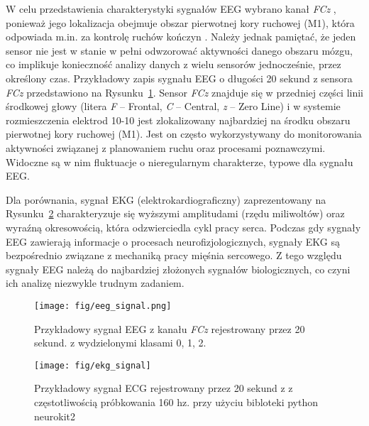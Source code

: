 \documentclass[eeg_v4.tex]{subfiles}
\begin{document}
    W celu przedstawienia charakterystyki sygnałów EEG wybrano kanał \textit{FCz}
    , ponieważ jego lokalizacja obejmuje obszar pierwotnej kory ruchowej (M1), która odpowiada m.in. za kontrolę ruchów
    kończyn \cite{Silva2020}
    . Należy jednak pamiętać, że jeden sensor nie jest w stanie w pełni odwzorować aktywności danego obszaru mózgu, co
    implikuje konieczność analizy danych z wielu sensorów jednocześnie, przez określony czas. Przykładowy zapis sygnału
    EEG o długości 20 sekund z sensora \textit{FCz} przedstawiono na Rysunku~\ref{fig:eeg_signal}. Sensor \textit{FCz}
    znajduje się w przedniej części linii środkowej głowy (litera \textit{F} – Frontal, \textit{C} – Central, \textit{z}
    – Zero Line) i w systemie rozmieszczenia elektrod 10-10 jest zlokalizowany najbardziej na środku obszaru pierwotnej
    kory ruchowej (M1). Jest on często wykorzystywany do monitorowania aktywności związanej z planowaniem ruchu oraz
    procesami poznawczymi. Widoczne są w nim fluktuacje o nieregularnym charakterze, typowe dla sygnału EEG.


    Dla porównania, sygnał EKG (elektrokardiograficzny) zaprezentowany na Rysunku~\ref{fig:ecg_signal}
    charakteryzuje się wyższymi amplitudami (rzędu miliwoltów) oraz wyraźną okresowością, która odzwierciedla cykl pracy
    serca. Podczas gdy sygnały EEG zawierają informacje o procesach neurofizjologicznych, sygnały EKG są bezpośrednio
    związane z mechaniką pracy mięśnia sercowego. Z tego względu sygnały EEG należą do najbardziej złożonych sygnałów
    biologicznych, co czyni ich analizę niezwykle trudnym zadaniem.


    \begin{figure}[h]
        \centering
        \texttt{[image: fig/eeg\_signal.png]}
        \caption
        {Przykładowy sygnał EEG z kanału \textit{FCz} rejestrowany przez 20 sekund. z wydzielonymi klasami 0, 1, 2.}
        \label{fig:eeg_signal}
    \end{figure}

    \begin{figure}[h]
        \centering
        \texttt{[image: fig/ekg\_signal]}
        \caption{Przykładowy sygnał ECG rejestrowany przez 20 sekund z z częstotliwością próbkowania 160 hz. przy użyciu
        bibloteki python neurokit2}
        \label{fig:ecg_signal}
    \end{figure}
\end{document}
